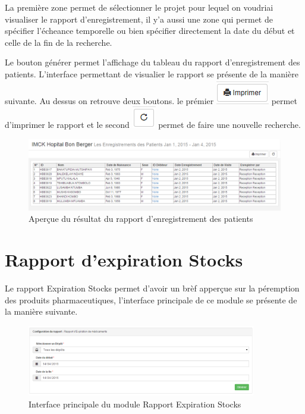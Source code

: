 \documentclass[12pt,a4paper]{report}
\begin{document}
La première zone permet de sélectionner le projet pour lequel on voudriai visualiser le rapport d'enregistrement, il y'a aussi une zone qui permet de spécifier l'écheance temporelle  ou bien spécifier directement la date du début et celle de la fin de la recherche. 

Le bouton générer permet l'affichage du tableau du rapport d'enregistrement des patients. L'interface permettant de visualier le rapport se présente de la manière suivante. Au dessus on retrouve deux boutons. le prémier 
\includegraphics[scale=0.7]{pic/Print.png} permet d'imprimer le rapport et le second \includegraphics[scale=0.7]{pic/refresh.png} permet de faire une nouvelle recherche.


\begin{figure}[h]
\begin{center}
\includegraphics[width=12cm]{pic/PatientSaving.png}
\end{center}
\caption{Aperçue du résultat du rapport d'enregistrement des patients}
\label{Aperçue du résultat du rapport d'enregistrement des patients}
\end{figure}

\newpage
\section{Rapport d'expiration Stocks}
Le rapport Expiration Stocks permet d'avoir un brèf apperçue sur la péremption des produits pharmaceutiques, l'interface principale de ce module se présente de la manière suivante.

\begin{figure}[h]
\begin{center}
\includegraphics[width=10cm]{pic/RappExMedi.png}
\end{center}
\caption{Interface principale du module Rapport Expiration Stocks}
\label{Interface principale du module Rapport Expiration Stocks}
\end{figure}
\end{document}
